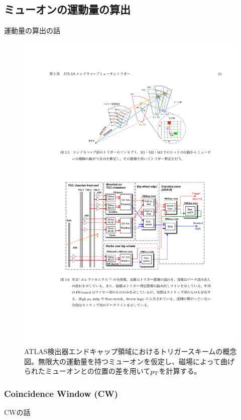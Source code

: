 \subsection{ミューオンの運動量の算出}
運動量の算出の話
\begin{figure}[tb]
  \centering
  \includegraphics[clip, width=14cm]{fig/3/akatsuka_mt_trigger_scheme.pdf}
  \caption{ATLAS検出器エンドキャップ領域におけるトリガースキームの概念図\cite{article:akatsuka-mron}。無限大の運動量を持つミューオンを仮定し、磁場によって曲げられたミューオンとの位置の差を用いて$p_\mathrm{T}$を計算する。}
  \label{fig:trigger-scheme}
\end{figure}

\subsubsection{Coincidence Window (CW)}
CWの話

